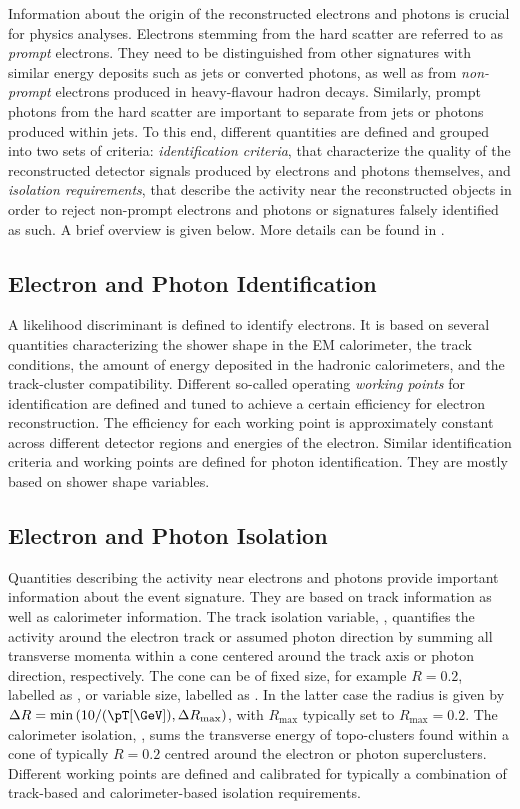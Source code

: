 Information about the origin of the reconstructed electrons and photons is crucial for physics analyses.
Electrons stemming from the hard scatter are referred to as \emph{prompt} electrons. They need to be distinguished from other signatures with similar energy deposits such as jets or converted photons, as well as from \emph{non-prompt} electrons produced in heavy-flavour hadron decays.
Similarly, prompt photons from the hard scatter are important to separate from jets or photons produced within jets.
To this end, different quantities are defined and grouped into two sets of criteria: \emph{identification criteria}, that characterize the quality of the reconstructed detector signals produced by electrons and photons themselves, and \emph{isolation requirements}, that describe the activity near the reconstructed objects in order to reject non-prompt electrons and photons or signatures falsely identified as such. A brief overview is given below. More details can be found in .

\subsection{Electron and Photon Identification}
A likelihood discriminant is defined to identify electrons. It is based on several quantities characterizing the shower shape in the EM calorimeter, the track conditions, the amount of energy deposited in the hadronic calorimeters, and the track-cluster compatibility. Different so-called operating \emph{working points} for identification are defined and tuned to achieve a certain efficiency for electron reconstruction. The efficiency for each working point is approximately constant across different detector regions and energies of the electron.
Similar identification criteria and working points are defined for photon identification. They are mostly based on shower shape variables.

\subsection{Electron and Photon Isolation}
Quantities describing the activity near electrons and photons provide important information about the event signature. They are based on track information as well as calorimeter information.
The track isolation variable, \pTcone, quantifies the activity around the electron track or assumed photon direction by summing all transverse momenta within a cone centered around the track axis or photon direction, respectively. The cone can be of fixed size, for example $R=0.2$, labelled as \pTconetwenty, or variable size, labelled as \pTvarcone. In the latter case the radius is given by $\Delta R = \text{min} \left( 10 / (\pT \text{[\GeV])}, \Delta R_{\text{max}}  \right)$, with $R_{\text{max}}$ typically set to $R_{\text{max}} = 0.2$.
The calorimeter isolation, \ETconetwenty, sums the transverse energy of topo-clusters found within a cone of typically $R=0.2$ centred around the electron or photon superclusters.
Different working points are defined and calibrated for typically a combination of track-based and calorimeter-based isolation requirements.

